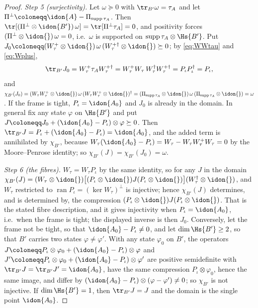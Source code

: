 \begin{proof}
\emph{Step 5 (surjectivity).} Let $\omega\succeq0$ with
$\tr_{B'}\omega=\tau_A$ and let
$\Pi^{\perp}\coloneqq\idon{A}-\Pi_{\operatorname{supp}\tau_A}$. Then
$\tr[(\Pi^{\perp}\otimes\idon{B'})\,\omega]
=\tr[\Pi^{\perp}\tau_A]=0$, and positivity forces
$(\Pi^{\perp}\otimes\idon{})\,\omega=0$, i.e.\ $\omega$ is supported on
$\operatorname{supp}\tau_A\otimes\Hs{B'}$. Put
$J_0\coloneqq(W_{\tau}^{+}\otimes\idon{})\,\omega\,
(W_{\tau}^{+\dagger}\otimes\idon{})\succeq0$; by \eqref{eq:WWtau} and
\eqref{eq:Wplus},
\begin{equation*}
  \tr_{B'}J_0=W_{\tau}^{+}\tau_AW_{\tau}^{+\dagger}
  =W_{\tau}^{+}W_{\tau}\,W_{\tau}^{\dagger}W_{\tau}^{+\dagger}
  =P_{\iota}P_{\iota}^{\dagger}=P_{\iota},
\end{equation*}
and $\chi_{B'}(J_0)
=(W_{\tau}W_{\tau}^{+}\otimes\idon{})\,\omega\,
(W_{\tau}W_{\tau}^{+}\otimes\idon{})^{\dagger}
=(\Pi_{\operatorname{supp}\tau_A}\otimes\idon{})\,\omega\,
(\Pi_{\operatorname{supp}\tau_A}\otimes\idon{})=\omega$. If the frame is
tight, $P_{\iota}=\idon{A_0}$ and $J_0$ is already in the domain. In
general fix any state $\varphi$ on $\Hs{B'}$ and put
$J\coloneqq J_0+(\idon{A_0}-P_{\iota})\otimes\varphi\succeq0$. Then
$\tr_{B'}J=P_{\iota}+(\idon{A_0}-P_{\iota})=\idon{A_0}$, and the added
term is annihilated by $\chi_{B'}$, because
$W_{\tau}(\idon{A_0}-P_{\iota})
=W_{\tau}-W_{\tau}W_{\tau}^{+}W_{\tau}=0$ by the Moore--Penrose identity;
so $\chi_{B'}(J)=\chi_{B'}(J_0)=\omega$.

\emph{Step 6 (the fibres).} $W_{\tau}=W_{\tau}P_{\iota}$ by the same
identity, so for any $J$ in the domain
$\chi_{B'}(J)=(W_{\tau}\otimes\idon{})\big[(P_{\iota}\otimes\idon{})J
(P_{\iota}\otimes\idon{})\big](W_{\tau}^{\dagger}\otimes\idon{})$, and
$W_{\tau}$ restricted to $\operatorname{ran}P_{\iota}
=(\ker W_{\tau})^{\perp}$ is injective; hence $\chi_{B'}(J)$ determines,
and is determined by, the compression
$(P_{\iota}\otimes\idon{})J(P_{\iota}\otimes\idon{})$. That is the stated
fibre description, and it gives injectivity when $P_{\iota}=\idon{A_0}$,
i.e.\ when the frame is tight; the displayed inverse is then $J_0$.
Conversely, let the frame not be tight, so that
$\idon{A_0}-P_{\iota}\ne0$, and let $\dim\Hs{B'}\ge2$, so that $B'$ carries
two states $\varphi\ne\varphi'$. With any state $\varphi_0$ on $B'$, the
operators $J\coloneqq P_{\iota}\otimes\varphi_0
+(\idon{A_0}-P_{\iota})\otimes\varphi$ and
$J'\coloneqq P_{\iota}\otimes\varphi_0
+(\idon{A_0}-P_{\iota})\otimes\varphi'$ are positive semidefinite with
$\tr_{B'}J=\tr_{B'}J'=\idon{A_0}$, have the same compression
$P_{\iota}\otimes\varphi_0$, hence the same image, and differ by
$(\idon{A_0}-P_{\iota})\otimes(\varphi-\varphi')\ne0$; so $\chi_{B'}$ is
not injective. If $\dim\Hs{B'}=1$, then $\tr_{B'}J=J$ and the domain is
the single point $\idon{A_0}$.
\end{proof}
